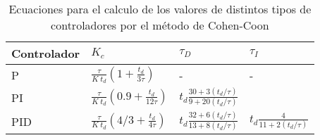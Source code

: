 \begin{table}[H]
    \caption{ Ecuaciones para el calculo de los valores de distintos tipos de controladores por el método de Cohen-Coon} 
    \centering
    \begin{tabular}{llll}
    \hline
    Controlador & $K_c$ & $\tau_D$ & $\tau_I$  \\
    \hline
    P                   & $\frac{\tau}{K\:t_d}\left(1 +\frac{t_d}{3 \tau}  \right) $   & -   &-     \\
    PI                  & $\frac{\tau}{K\:t_d}\left(0.9 +\frac{t_d}{12 \tau}  \right) $   & $ t_d \frac{30 + 3(t_d/\tau)}{9+20(t_d/\tau)}$   &     \\
    PID                 &  $\frac{\tau}{K\:t_d}\left(4/3 +\frac{t_d}{4 \tau}  \right) $  & $ t_d \frac{32 + 6(t_d/\tau)}{13+8(t_d/\tau)}$   &  $ t_d \frac{4}{11+2(t_d/\tau)}$   \\
    \hline
    \end{tabular}
    \label{tabla:ecucontrol}
\end{table}